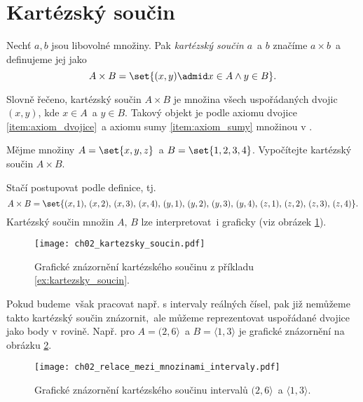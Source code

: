 \section{Kartézský součin}\label{sec:kartezsky_soucin}
\begin{definition}\label{def:kartezsky_soucin}
    Nechť $a,b$ jsou libovolné množiny. Pak \emph{kartézský součin} $a$~a $b$ značíme $a\times b$~a definujeme jej jako
    \begin{equation*}
        A\times B=\set{(x,y) \admid x\in A \land y\in B}.
    \end{equation*}
\end{definition}
Slovně řečeno, kartézský součin $A\times B$ je množina všech uspořádaných dvojic $(x,y)$, kde $x\in A$~a $y\in B$. Takový objekt je podle axiomu dvojice \ref{item:axiom_dvojice}~a axiomu sumy \ref{item:axiom_sumy} množinou v \ZF{}.
\begin{example}\label{ex:kartezsky_soucin}
    Mějme množiny $A=\set{x,y,z}$~a $B=\set{1,2,3,4}$. Vypočítejte kartézský součin $A\times B$.
\end{example}
\begin{solution}
    Stačí postupovat podle definice, tj.
    \begin{equation*}
        A\times B=\set{(x,1),\,(x,2),\,(x,3),\,(x,4),\,(y,1),\,(y,2),\,(y,3),\,(y,4),\,(z,1),\,(z,2),\,(z,3),\,(z,4)}.
    \end{equation*}
    Kartézský součin množin $A,\,B$ lze interpretovat~i graficky (viz obrázek \ref{fig:kartezsky_soucin}).
\end{solution}
\begin{figure}[H]
    \centering
    \texttt{[image: ch02\_kartezsky\_soucin.pdf]}
    \caption{Grafické znázornění kartézského součinu z příkladu \ref{ex:kartezsky_soucin}.}
    \label{fig:kartezsky_soucin}
\end{figure}
Pokud budeme~však pracovat např. s intervaly reálných čísel, pak již nemůžeme takto kartézský součin znázornit,~ale můžeme reprezentovat uspořádané dvojice jako body v rovině. Např. pro $A=(2, 6\rangle$~a $B=\langle 1,3 \rangle$ je grafické znázornění na obrázku \ref{fig:kartezsky_soucin_intervaly}.
\begin{figure}[H]
    \centering
    \texttt{[image: ch02\_relace\_mezi\_mnozinami\_intervaly.pdf]}
    \caption{Grafické znázornění kartézského součinu intervalů $(2, 6\rangle$~a $\langle 1,3 \rangle$.}
    \label{fig:kartezsky_soucin_intervaly}
\end{figure}

